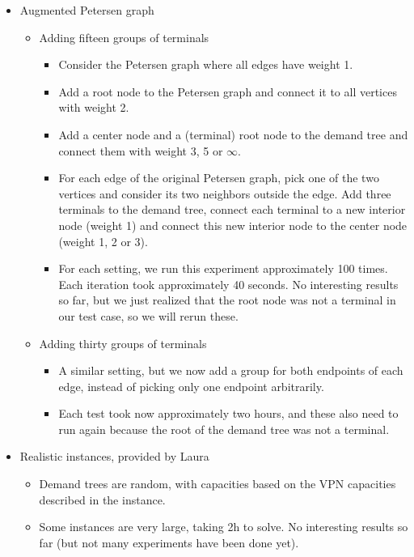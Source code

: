 \documentclass[11pt]{article}
\begin{document}
\begin{itemize}
        \item Augmented Petersen graph
        \begin{itemize}
            \item Adding fifteen groups of terminals
            \begin{itemize}
                \item Consider the Petersen graph where all edges have weight 1.
                \item Add a root node to the Petersen graph and connect it to all vertices with weight 2.
                \item Add a center node and a (terminal) root node to the demand tree and connect them with weight 3, 5 or $\infty$.
                \item For each edge of the original Petersen graph, pick one of the two vertices and consider its two neighbors outside the edge.
                Add three terminals to the demand tree, connect each terminal to a new interior node (weight 1) and connect this new interior node to the center node (weight 1, 2 or 3).
                \item For each setting, we run this experiment approximately 100 times.
                Each iteration took approximately 40 seconds.
                No interesting results so far, but we just realized that the root node was not a terminal in our test case, so we will rerun these.
            \end{itemize}
            \item Adding thirty groups of terminals
            \begin{itemize}
                \item A similar setting, but we now add a group for both endpoints of each edge, instead of picking only one endpoint arbitrarily.
                \item Each test took now approximately two hours, and these also need to run again because the root of the demand tree was not a terminal.
            \end{itemize}

        \end{itemize}

        \item Realistic instances, provided by Laura
        \begin{itemize}
            \item Demand trees are random, with capacities based on the VPN capacities described in the instance.
            \item Some instances are very large, taking 2h to solve.
            No interesting results so far (but not many experiments have been done yet).
        \end{itemize}
    \end{itemize}
\end{document}
